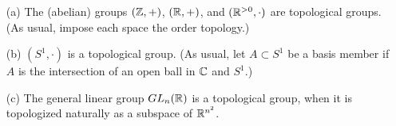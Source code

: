 \begin{exmp}
    \begin{enumerate}
        \item[(a)]
        {
            The (abelian) groups $({\mathbb{Z}}, +)$, $({\mathbb{R}}, +)$, and $({\mathbb{R}}^{>0}, \cdot)$ are topological groups. (As usual, impose each space the order topology.)
        }
        \item[(b)]
        {
            $(S^1, \cdot)$ is a topological group. (As usual, let $A\subset S^1$ be a basis member if $A$ is the intersection of an open ball in ${\mathbb{C}}$ and $S^1$.)
        }
        \item[(c)]
        {
            The general linear group $GL_n({\mathbb{R}})$ is a topological group, when it is topologized naturally as a subspace of ${\mathbb{R}}^{n^2}$.
        }
    \end{enumerate}
\end{exmp}

